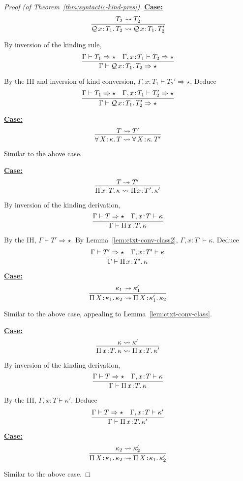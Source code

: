 \documentclass{article}
\newcommand{\abs}[4]{{#1}\, #2\! : \! #3.\, #4}
\newcommand{\tpsynth}[0]{\Rightarrow}
\newcommand{\startcase}[1]{\vspace{#1} \noindent\textbf{\underline{Case:}}}
\begin{document}
\begin{proof}[Proof (of Theorem~\ref{thm:syntactic-kind-pres})]
  \startcase{.2cm}
  \[
    \infer{
      \abs{\mathcal{Q}}{x}{T_1}{T_2}
      \rightsquigarrow
      \abs{\mathcal{Q}}{x}{T_1}{T_2'}
    }{
      T_2 \rightsquigarrow T_2'
    }
  \]

  By inversion of the kinding rule,
  \[
    \infer{
      \Gamma \vdash \abs{\mathcal{Q}}{x}{T_1}{T_2} \tpsynth \star
    }{
      \Gamma \vdash T_1 \tpsynth \star
      & \Gamma,x\!:\!T_1 \vdash T_2 \tpsynth \star
    }
  \]

  By the IH and inversion of kind conversion, \(\Gamma,x\!:\!T_1 \vdash T_2'
  \tpsynth \star\).
  Deduce
  \[
    \infer{
      \Gamma \vdash \abs{\mathcal{Q}}{x}{T_1}{T_2'} \tpsynth \star
    }{
      \Gamma \vdash T_1 \tpsynth \star
      & \Gamma,x\!:\!T_1 \vdash T_2' \tpsynth \star
    }
  \]

  \startcase{.2cm}
  \[
    \infer{
      \abs{\forall}{X}{\kappa}{T} \rightsquigarrow \abs{\forall}{X}{\kappa}{T'}
    }{
      T \rightsquigarrow T'
    }
  \]

  Similar to the above case.

  \startcase{.2cm}
  \[
    \infer{
      \abs{\Pi}{x}{T}{\kappa} \rightsquigarrow \abs{\Pi}{x}{T'}{\kappa'}
    }{
      T \rightsquigarrow T'
    }
  \]

  By inversion of the kinding derivation,
  \[
    \infer{
      \Gamma \vdash \abs{\Pi}{x}{T}{\kappa}
    }{
      \Gamma \vdash T \tpsynth \star
      \quad \Gamma,x\!:\!T \vdash \kappa
    }
  \]

  By the IH, \(\Gamma \vdash T' \tpsynth \star\).
  By Lemma~\ref{lem:ctxt-conv-class2}, \(\Gamma,x\!:\!T' \vdash \kappa\).
  Deduce
  \[
    \infer{
      \Gamma \vdash \abs{\Pi}{x}{T'}{\kappa}
    }{
      \Gamma \vdash T' \tpsynth \star
      \quad \Gamma,x\!:\!T' \vdash \kappa
    }
  \]

  \startcase{.2cm}
  \[
    \infer{
      \abs{\Pi}{X}{\kappa_1}{\kappa_2} \rightsquigarrow \abs{\Pi}{X}{\kappa_1'}{\kappa_2}
    }{
      \kappa_1 \rightsquigarrow \kappa_1'
    }
  \]

  Similar to the above case, appealing to Lemma~\ref{lem:ctxt-conv-class}.

  \startcase{.2cm}
  \[
    \infer{
      \abs{\Pi}{x}{T}{\kappa} \rightsquigarrow \abs{\Pi}{x}{T}{\kappa'}
    }{
      \kappa \rightsquigarrow \kappa'
    }
  \]

  By inversion of the kinding derivation,
  \[
    \infer{
      \Gamma \vdash \abs{\Pi}{x}{T}{\kappa}
    }{
      \Gamma \vdash T \tpsynth \star
      \quad \Gamma,x\!:\!T \vdash \kappa
    }
  \]

  By the IH, \(\Gamma,x\!:\!T \vdash \kappa'\).
  Deduce
  \[
    \infer{
      \Gamma \vdash \abs{\Pi}{x}{T}{\kappa'}
    }{
      \Gamma \vdash T \tpsynth \star
      \quad \Gamma,x\!:\!T \vdash \kappa'
    }
  \]

  \startcase{.2cm}
  \[
    \infer{
      \abs{\Pi}{X}{\kappa_1}{\kappa_2} \rightsquigarrow \abs{\Pi}{X}{\kappa_1}{\kappa_2'}
    }{
      \kappa_2 \rightsquigarrow \kappa_2'
    }
  \]

  Similar to the above case.
\end{proof}
\end{document}
